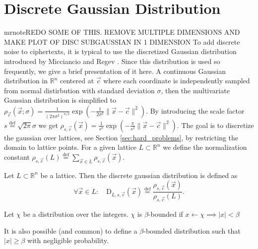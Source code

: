 \section{Discrete Gaussian Distribution}
mrnote{REDO SOME OF THIS. REMOVE MULTIPLE DIMENSIONS AND MAKE PLOT OF DISC SUBGAUSSIAN IN 1 DIMENSION}
To add discrete noise to ciphertexts, it is typical to use the discretized Gaussian distribution introduced by Micciancio and Regev \cite{disc-gauss}. Since this distribution is used so frequently, we give a brief presentation of it here. A continuous Gaussian distribution in $\mathbb{R}^n$ centered at $\vec{c}$ where each coordinate is independently sampled from normal distirbution with standard deviation $\sigma$, then the multivariate Gaussian distribution is simplified to $\rho_{\vec{c}}(\vec{x}; \sigma)=\frac{1}{\left(2 \pi \sigma^2\right)^{n / 2}} \exp \left( -\frac{1}{2 \sigma^2} \| \vec{x}-\vec{c} \| ^2\right)$. By introducing the scale factor $s \stackrel{\mathrm{def}}{=} \sqrt{2\pi}\sigma$ we get $\rho_{s, \vec{c}}(\vec{x})=\frac{1}{s^n} \exp \left(-\frac{\pi}{s^2} \| \vec{x}-\vec{c} \| ^2\right)$.
The goal is to discretize the gaussian over lattices, see Section \ref{sec:hard_problems}, by restricting the domain to lattice points. For a given lattice $L \subset \mathbb{R}^n$ we define the normalization constant $\rho_{s, \vec{c}}(L) \stackrel{\mathrm{def}}{=} \sum_{\vec{x} \in L} \rho_{s, \vec{c}}(\vec{x})$.
\begin{definition}\label{Disc-Gauss}
    Let $L \subset \mathbb{R}^n$ be a lattice. Then the discrete gaussian distribution is defined as
    \begin{equation*}
        \forall \vec{x} \in L \colon \quad \textrm{D}_{L, s, \vec{c}}(\vec{x}) \stackrel{\mathrm{def}}{=} \frac{\rho_{s, \vec{c}}(\vec{x})}{\rho_{s, \vec{c}}(L)}.
    \end{equation*}            
\end{definition}
\begin{definition}
    Let $\chi$ be a distribution over the integers. $\chi$ is $\beta$-bounded if $x \leftarrow \chi \implies |x| < \beta$
\end{definition}
\begin{remark}
    It is also possible (and common) to define a $\beta$-bounded distribution such that $|x| \geq \beta$ with negligible probability.
\end{remark}
